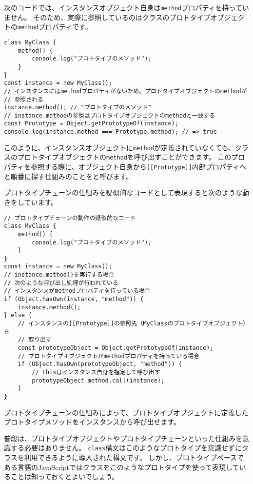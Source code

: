 次のコードでは、インスタンスオブジェクト自身は\texttt{method}プロパティを持っていません。
そのため、実際に参照しているのはクラスのプロトタイプオブジェクトの\texttt{method}プロパティです。

\begin{lstlisting}
class MyClass {
    method() {
        console.log("プロトタイプのメソッド");
    }
}
const instance = new MyClass();
// インスタンスにはmethodプロパティがないため、プロトタイプオブジェクトのmethodが
// 参照される
instance.method(); // "プロトタイプのメソッド"
// instance.methodの参照はプロトタイプオブジェクトのmethodと一致する
const Prototype = Object.getPrototypeOf(instance);
console.log(instance.method === Prototype.method); // => true
\end{lstlisting}

このように、インスタンスオブジェクトに\texttt{method}が定義されていなくても、クラスのプロトタイプオブジェクトの\texttt{method}を呼び出すことができます。
このプロパティを参照する際に、オブジェクト自身から\texttt{[[Prototype]]}内部プロパティへと順番に探す仕組みのことを\textbf{}と呼びます。

プロトタイプチェーンの仕組みを疑似的なコードとして表現すると次のような動きをしています。

\begin{lstlisting}
// プロトタイプチェーンの動作の疑似的なコード
class MyClass {
    method() {
        console.log("プロトタイプのメソッド");
    }
}
const instance = new MyClass();
// instance.method()を実行する場合
// 次のような呼び出し処理が行われている
// インスタンスがmethodプロパティを持っている場合
if (Object.hasOwn(instance, "method")) {
    instance.method();
} else {
    // インスタンスの[[Prototype]]の参照先（MyClassのプロトタイプオブジェクト）を
    // 取り出す
    const prototypeObject = Object.getPrototypeOf(instance);
    // プロトタイプオブジェクトがmethodプロパティを持っている場合
    if (Object.hasOwn(prototypeObject, "method")) {
        // thisはインスタンス自身を指定して呼び出す
        prototypeObject.method.call(instance);
    }
}
\end{lstlisting}

プロトタイプチェーンの仕組みによって、プロトタイプオブジェクトに定義したプロトタイプメソッドをインスタンスから呼び出せます。

普段は、プロトタイプオブジェクトやプロトタイプチェーンといった仕組みを意識する必要はありません。
\texttt{class}構文はこのようなプロトタイプを意識せずにクラスを利用できるように導入された構文です。
しかし、プロトタイプベースである言語のJavaScriptではクラスをこのようなプロトタイプを使って表現していることは知っておくとよいでしょう。

